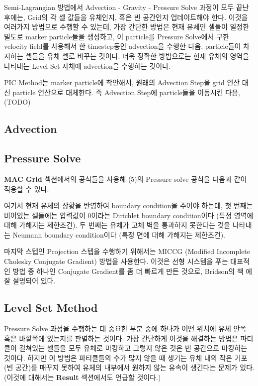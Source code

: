 \documentclass[10pt, A4]{article}
\begin{document}
Semi-Lagrangian 방법에서 Advection - Gravity - Pressure Solve 과정이 모두 끝난 후에는, Grid의 각 셀 값들을 유체인지, 혹은 빈 공간인지 업데이트해야 한다. 이것을 여러가지 방법으로 수행할 수 있는데, 가장 간단한 방법은 현재 유체인 셀들이 일정한 밀도로 marker particle들을 생성하고, 이 particle를 Pressure Solve에서 구한 velocity field를 사용해서 한 timestep동안 advection을 수행한 다음, particle들이 차지하는 셀들을 유체 셀로 바꾸는 것이다. 더욱 정확한 방법으로는 현재 유체의 영역을 나타내는 Level Set 자체에 advection을 수행하는 것이다. 

PIC Method는 marker particle에 착안해서, 원래의 Advection Step을 grid 연산 대신 particle 연산으로 대체한다. 즉 Advection Step에 particle들을 이동시킨 다음, (TODO)

\subsection{Advection}

\subsection{Pressure Solve}

\textbf{MAC Grid} 섹션에서의 공식들을 사용해 (5)의 Pressure solve 공식을 다음과 같이 적용할 수 있다.

여기서 현재 유체의 상황을 반영하여 boundary condition을 주어야 하는데, 첫 번째는 비어있는 셀들에는 압력값이 0이라는 Dirichlet boundary condition이다 (특정 영역에 대해 가해지는 제한조건). 두 번째는 유체가 고체 벽을 통과하지 못한다는 것을 나타내는 Neumann boundary condition이다 (특정 면에 대해 가해지는 제한조건).

마지막 스텝인 Projection 스텝을 수행하기 위해서는 MICCG (Modified Incomplete Cholesky Conjugate Gradient) 방법을 사용한다. 이것은 선형 시스템을 푸는 대표적인 방법 중 하나인 Conjugate Gradient를 좀 더 빠르게 만든 것으로, Bridson의 책 \cite[p.79]{fluid-sim-cg}에 잘 설명되어 있다.

\subsection{Level Set Method}

Pressure Solve 과정을 수행하는 데 중요한 부분 중에 하나가 어떤 위치에 유체 안쪽 혹은 바깥쪽에 있는지를 판별하는 것이다. 가장 간단하게 이것을 해결하는 방법은 파티클이 걸쳐있는 셀들을 모두 유체로 마킹하고 그렇지 않은 것은 빈 공간으로 마킹하는 것이다. 하지만 이 방법은 파티클들의 수가 많지 않을 때 생기는 유체 내의 작은 기포 (빈 공간)를 매꾸지 못하여 유체의 내부에서 원하지 않는 유속이 생긴다는 문제가 있다. (이것에 대해서는 \textbf{Result} 섹션에서도 언급할 것이다.) 
\end{document}
